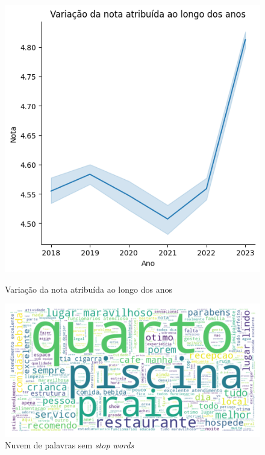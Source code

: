 \begin{figure}
	\centering
	\begin{minipage}{0.45\textwidth}
		\centering
		\includegraphics[width=1\textwidth]{figs/exploratoria/relplot_ano_rating.png}
		\caption{Variação da nota atribuída ao longo dos anos}
		\label{img:relplot_ano_rating}
	\end{minipage}\hfill
	\begin{minipage}{0.45\textwidth}
		\centering
		\includegraphics[width=1\textwidth]{figs/exploratoria/wordcloud_geral.png}
		\caption{Nuvem de palavras sem \textit{stop words}}
		\label{img:wordcloud_geral}
	\end{minipage}
\end{figure}

